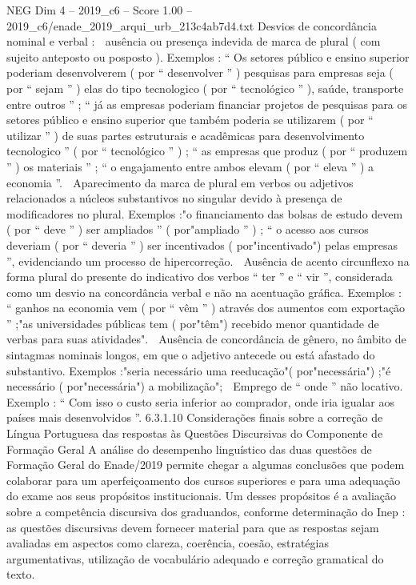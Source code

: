 \begin{textsample}{NEG Dim 4 – 2019\_c6 – Score 1.00 – 2019\_c6/enade\_2019\_arqui\_urb\_213c4ab7d4.txt}
Desvios de concordância nominal e verbal :  ausência ou presença indevida de marca de plural ( com sujeito anteposto ou posposto ).
Exemplos : “ Os setores público e ensino superior poderiam desenvolverem ( por “ desenvolver ” ) pesquisas para empresas seja ( por “ sejam ” ) elas do tipo tecnologico ( por “ tecnológico ” ), saúde, transporte entre outros ” ; “ já as empresas poderiam financiar projetos de pesquisas para os setores público e ensino superior que também poderia se utilizarem ( por “ utilizar ” ) de suas partes estruturais e acadêmicas para desenvolvimento tecnologico ” ( por “ tecnológico ” ) ; “ as empresas que produz ( por “ produzem ” ) os materiais ” ; “ o engajamento entre ambos elevam ( por “ eleva ” ) a economia ”.  Aparecimento da marca de plural em verbos ou adjetivos relacionados a núcleos substantivos no singular devido à presença de modificadores no plural.
Exemplos :"o financiamento das bolsas de estudo devem ( por “ deve ” ) ser ampliados ” ( por"ampliado ” ) ; “ o acesso aos cursos deveriam ( por “ deveria ” ) ser incentivados ( por"incentivado") pelas empresas ”, evidenciando um processo de hipercorreção.  Ausência de acento circunflexo na forma plural do presente do indicativo dos verbos “ ter ” e “ vir ”, considerada como um desvio na concordância verbal e não na acentuação gráfica.
Exemplos : “ ganhos na economia vem ( por “ vêm ” ) através dos aumentos com exportação ” ;"as universidades públicas tem ( por"têm") recebido menor quantidade de verbas para suas atividades".  Ausência de concordância de gênero, no âmbito de sintagmas nominais longos, em que o adjetivo antecede ou está afastado do substantivo.
Exemplos :"seria necessário uma reeducação"( por"necessária") ;"é necessário ( por"necessária") a mobilização";  Emprego de “ onde ” não locativo.
Exemplo : “ Com isso o custo seria inferior ao comprador, onde iria igualar aos países mais desenvolvidos ”. 6.3.1.10 Considerações finais sobre a correção de Língua Portuguesa das respostas às Questões Discursivas do Componente de Formação Geral A análise do desempenho linguístico das duas questões de Formação Geral do Enade/2019 permite chegar a algumas conclusões que podem colaborar para um aperfeiçoamento dos cursos superiores e para uma adequação do exame aos seus propósitos institucionais.
Um desses propósitos é a avaliação sobre a competência discursiva dos graduandos, conforme determinação do Inep : as questões discursivas devem fornecer material para que as respostas sejam avaliadas em aspectos como clareza, coerência, coesão, estratégias argumentativas, utilização de vocabulário adequado e correção gramatical do texto.

\end{textsample}

